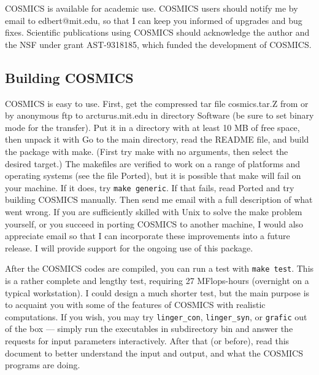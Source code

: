 COSMICS is available for academic use.  COSMICS users should notify me
by email to edbert@mit.edu, so that I can keep you informed of
upgrades and bug fixes.  Scientific publications using COSMICS should
acknowledge the author and the NSF under grant AST-9318185, which funded
the development of COSMICS.

\subsection{Building COSMICS}
\label{build}

COSMICS is easy to use.  First, get the compressed tar file
cosmics.tar.Z from \hfil\newline
\indent{}\hfil\newline
or by anonymous ftp to arcturus.mit.edu in directory Software (be
sure to set binary mode for the transfer).  Put it in a directory
with at least 10 MB of free space, then unpack it with\hfil\newline
\indent{}\hfil\newline
Go to the main directory, read the README file, and build the package
with make.  (First try make with no arguments, then select the desired
target.)  The makefiles are verified to work on a range of platforms
and operating systems (see the file Ported), but it is possible that
make will fail on your machine.   If it does, try {\tt make generic}.
If that fails, read Ported and try building COSMICS manually.  Then
send me email with a full description of what went wrong.  If you are
sufficiently skilled with Unix to solve the make problem yourself,
or you succeed in porting COSMICS to another machine, I would also
appreciate email so that I can incorporate these improvements into a
future release.  I will provide support for the ongoing use of this
package.

After the COSMICS codes are compiled, you can run a test with {\tt make test}.
This is a rather complete and lengthy test, requiring 27 MFlops-hours
(overnight on a typical workstation).  I could design a much shorter
test, but the main purpose is to acquaint you with some of the features
of COSMICS with realistic computations.  If you wish, you may try
{\tt linger\_con}, {\tt linger\_syn}, or {\tt grafic} out of the box ---
simply run the executables in subdirectory bin and answer the requests
for input parameters interactively.  After that (or before), read this
document to better understand the input and output, and what the COSMICS
programs are doing.

